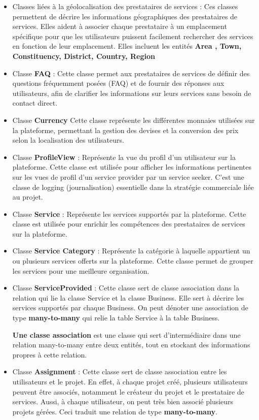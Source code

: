 \begin{itemize}
    \item Classes liées à la géolocalisation des prestataires de services : Ces classes permettent de décrire les informations géographiques des prestataires de services. Elles aident à associer chaque prestataire à un emplacement spécifique pour que les utilisateurs puissent facilement rechercher des services en fonction de leur emplacement.
    Elles incluent les entités \textbf{Area , Town, Constituency, District, Country, Region}
    \item Classe \textbf{FAQ} : Cette classe permet aux prestataires de services de définir des questions fréquemment posées (FAQ) et de fournir des réponses aux utilisateurs, afin de clarifier les informations sur leurs services sans besoin de contact direct.
    \item Classe \textbf{Currency} Cette classe représente les différentes monnaies utilisées sur la plateforme, permettant la gestion des devises et la conversion des prix selon la localisation des utilisateurs.

    \item Classe \textbf{ProfileView} : Représente la vue du profil d'un utilisateur sur la plateforme. Cette classe est utilisée pour afficher les informations pertinentes sur les vues de profil d'un service provider par un service seeker. C'est une classe de logging (journalisation) essentielle dans la stratégie commerciale liée au projet.

    \item Classe \textbf{Service} : Représente les services supportés par la plateforme. Cette classe est utilisée pour enrichir les compétences des prestataires de services sur la plateforme. 

    \item Classe \textbf{Service Category} : Représente la catégorie à laquelle appartient un ou plusieurs services offerts sur la plateforme. Cette classe permet de grouper les services pour une meilleure organisation.

    \item Classe \textbf{ServiceProvided} : Cette classe sert de classe association dans la relation qui lie la classe Service et la classe Business. Elle sert à décrire les services supportés par chaque Business. On peut dénoter une association de type \textbf{many-to-many} qui relie la table Service à la table Business. 
    
    \textbf{Une classe association} est une classe qui sert d’intermédiaire dans une relation many-to-many entre deux entités, tout en stockant des informations propres à cette relation.
    
    \item Classe \textbf{Assignment} : Cette classe sert de classe association entre les utilisateurs et le projet. En effet, à chaque projet créé, plusieurs utilisateurs peuvent être associés, notamment le créateur du projet et le prestataire de services. Aussi, à chaque utilisateur, on peut très bien associé plusieurs projets gérées. Ceci traduit une relation de type \textbf{many-to-many}. 

\end{itemize}

